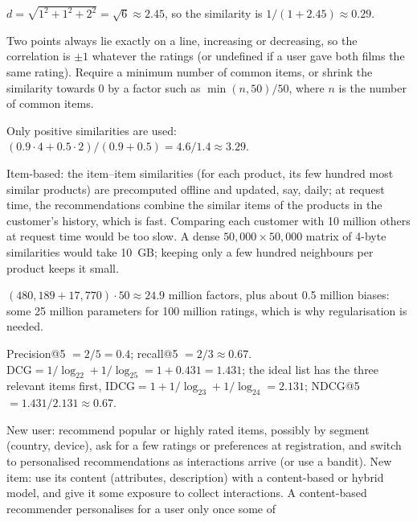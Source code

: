 \begin{description}[font=\bfseries,leftmargin=0pt,itemsep=5pt]
  \item[\ref{exr7:euclid}] $d=\sqrt{1^2+1^2+2^2}=\sqrt6\approx2.45$, so the similarity is $1/(1+2.45)\approx0.29$.
  \item[\ref{exr7:pearson}] Two points always lie exactly on a line, increasing or decreasing, so the correlation is $\pm1$ whatever the
        ratings (or undefined if a user gave both films the same rating). Require a minimum number of common items, or shrink the
        similarity towards 0 by a factor such as $\min(n,50)/50$, where $n$ is the number of common items.
  \item[\ref{exr7:predict}] Only positive similarities are used: $(0.9\cdot4+0.5\cdot2)/(0.9+0.5)=4.6/1.4\approx3.29$.
  \item[\ref{exr7:scale}] Item-based: the item--item similarities (for each product, its few hundred most similar products) are
        precomputed offline and updated, say, daily; at request time, the recommendations combine the similar items of the products in
        the customer's history, which is fast. Comparing each customer with 10 million others at request time would be too slow. A dense $50{,}000\times50{,}000$ matrix
        of 4-byte similarities would take 10~GB; keeping only a few hundred neighbours per product keeps it small.
  \item[\ref{exr7:params}] $(480{,}189+17{,}770)\cdot50\approx24.9$ million factors, plus about 0.5 million biases: some 25 million parameters
        for 100 million ratings, which is why regularisation is needed.
  \item[\ref{exr7:metrics}] Precision@5 $=2/5=0.4$; recall@5 $=2/3\approx0.67$. $\mathrm{DCG}=1/\log_22+1/\log_25=1+0.431=1.431$; the ideal list has the
        three relevant items first, $\mathrm{IDCG}=1+1/\log_23+1/\log_24=2.131$; NDCG@5 $=1.431/2.131\approx0.67$.
  \item[\ref{exr7:cold}] New user: recommend popular or highly rated items, possibly by segment (country, device), ask for a few ratings or
        preferences at registration, and switch to personalised recommendations as interactions arrive (or use a bandit). New item: use its
        content (attributes, description) with a content-based or hybrid model, and give it some exposure to collect interactions. A content-based recommender personalises for a user only once some of

\end{description}
